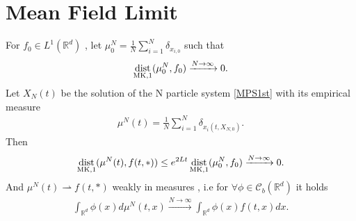 \section{Mean Field Limit}
\begin{theorem}\label{mean_field_limit}
  For $f_{0} \in  L^{1}(\mathbb{R}^{d} ) $ , let $\mu_0^{N} = \frac{1}{N} \sum_{i=1}^{N} \delta_{x_{i,0}} $  such that
  \begin{align*}
    \operatorname*{dist}_{\text{MK},1}(\mu_0^{N},f_{0} ) \xrightarrow{N\to \infty} 0
  .\end{align*}
  Let $X_N(t)$ be the solution of the N particle system \autoref{MPS1st} with its empirical measure   
  \begin{align*}
    \mu ^{N}(t) = \frac{1}{N}  \sum_{i=1}^{N}  \delta_{x_i(t,X_{N,0})}
  .\end{align*}
  Then 
  \begin{align*}
    \operatorname*{dist}_{\text{MK},1}(\mu ^{N}(t),f(t,*) ) \le e^{2Lt} \operatorname*{dist}_{\text{MK},1}(\mu_0^{N},f_{0} ) \xrightarrow{N \to \infty} 0
  .\end{align*}
  And $\mu ^{N}(t) \rightharpoonup f(t,*) $ weakly in measures , i.e for $\forall  \phi  \in  \mathcal{C}_b(\mathbb{R}^{d} )$ it holds 
  \begin{align*}
    \int_{\mathbb{R}^{d} }\phi(x)d\mu ^{N}(t,x) \xrightarrow{N\to \infty}  \int_{\mathbb{R}^{d} } \phi(x)f(t,x) dx 
  .\end{align*}
\end{theorem}
